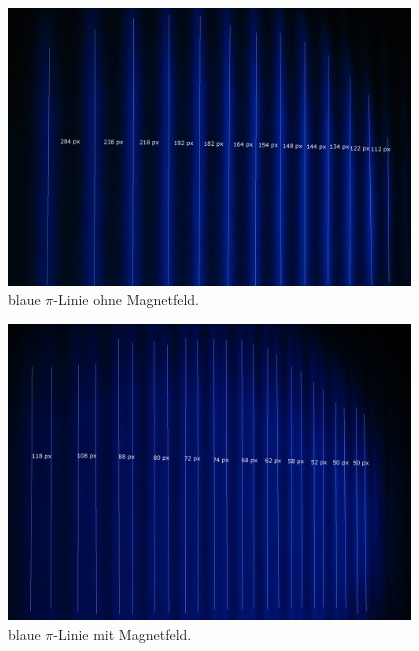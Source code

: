 \begin{figure}
  \centering
  \includegraphics[width=0.95\textwidth]{graphics/auswertung/IMG_1635.png}
  \caption{blaue $\pi$-Linie ohne Magnetfeld.}
  \label{}
\end{figure}
\begin{figure}
  \centering
  \includegraphics[width=0.95\textwidth]{graphics/auswertung/IMG_1644.png}
  \caption{blaue $\pi$-Linie mit Magnetfeld.}
  \label{}
\end{figure}

